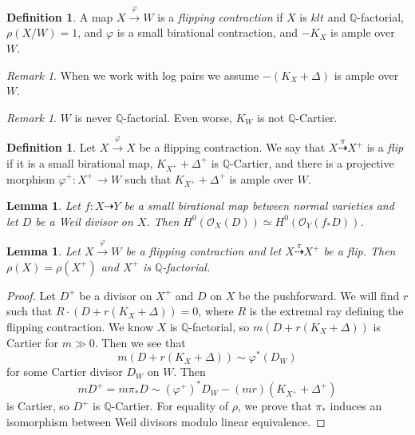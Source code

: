 \documentclass[leqno, openany]{memoir}
\newtheorem{lem}[thm]{Lemma}
\theoremstyle{definition}
\newtheorem{defn}[thm]{Definition}
\theoremstyle{remark}
\newtheorem{rmk}[thm]{Remark}
\theoremstyle{plain}
\theoremstyle{definition}
\theoremstyle{remark}
\newcommand{\Q}{\mathbb{Q}}
\newcommand{\msc}[1]{\mathscr{#1}}
\begin{document}
\begin{defn}
    A map $X \xrightarrow{\varphi} W$ is a \textit{flipping contraction} if $X$ is $klt$ and $\Q$-factorial, $\rho(X/W) = 1$, and $\varphi$ is a small birational contraction, and $-K_X$ is ample over $W$.
\end{defn}

\begin{rmk}
    When we work with log pairs we assume $-(K_X + \Delta)$ is ample over $W$.
\end{rmk}

\begin{rmk}
    $W$ is never $\Q$-factorial. Even worse, $K_W$ is not $\Q$-Cartier.
\end{rmk}

\begin{defn}
    Let $X \xrightarrow{\varphi} X$ be a flipping contraction. We say that $X \overset{\pi}{\dashrightarrow} X^+$ is a \textit{flip} if it is a small birational map, $K_{X^+} + \Delta^+$ is $\Q$-Cartier, and there is a projective morphism $\varphi^+ \colon X^+ \to W$ such that $K_{X^+} + \Delta^+$ is ample over $W$.
\end{defn}

\begin{lem}
    Let $f \colon X \dashrightarrow Y$ be a small birational map between normal varieties and let $D$ be a Weil divisor on $X$. Then $H^0(\msc{O}_X(D)) \simeq H^0(\msc{O}_Y(f_* D))$.
\end{lem}

\begin{lem}
    Let $X \xrightarrow{\varphi} W$ be a flipping contraction and let $X \overset{\pi}{\dashrightarrow} X^+$ be a flip. Then $\rho(X) = \rho(X^+)$ and $X^+$ is $\Q$-factorial.
\end{lem}

\begin{proof}
    Let $D^+$ be a divisor on $X^+$ and $D$ on $X$ be the pushforward. We will find $r$ such that $R \cdot (D + r(K_X + \Delta)) = 0$, where $R$ is the extremal ray defining the flipping contraction. We know $X$ is $\Q$-factorial, so $m(D + r(K_X + \Delta))$ is Cartier for $m \gg 0$. Then we see that
    \[ m(D + r(K_X + \Delta)) \sim \varphi^*(D_W) \]
    for some Cartier divisor $D_W$ on $W$. Then 
    \[ mD^+ = m \pi_* D \sim {(\varphi^+)}^* D_W - (mr)(K_{X^+} + \Delta^+) \]
    is Cartier, so $D^+$ is $\Q$-Cartier. For equality of $\rho$, we prove that $\pi_*$ induces an isomorphism between Weil divisors modulo linear equivalence.
\end{proof}
\end{document}
